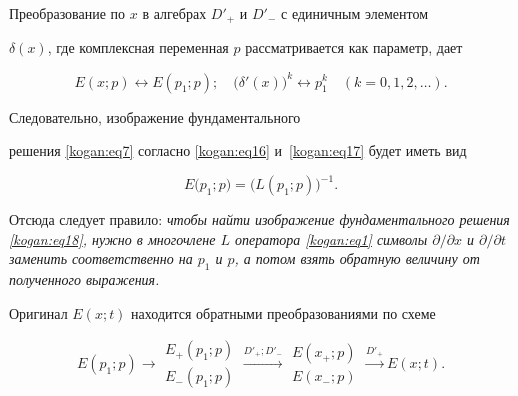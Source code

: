 Преобразование по $x$ в алгебрах $D'_+$ и $D'_-$ с единичным элементом 

$\delta (x)$, где комплексная переменная $p$ рассматривается как параметр, дает 

\begin{equation}

\label{kogan:eq17}

E(x;p)\leftrightarrow E(p_1 ;p);

\quad

\big(\delta'(x) \big)^k \leftrightarrow p_1^k

\quad

(k=0,1,2,\ldots).

\end{equation}

Следовательно, изображение фундаментального 

решения \eqref{kogan:eq7} согласно \eqref{kogan:eq16} и~\eqref{kogan:eq17} будет иметь вид

\begin{equation}

\label{kogan:eq18}

E\big(p_1 ;p\big)=\bigl(L(p_1 ;p) \bigr)^{-1}.

\end{equation}



Отсюда следует правило: {\sl чтобы найти изображение фундаментального решения \eqref{kogan:eq18}, нужно в многочлене $L$ оператора \eqref{kogan:eq1} символы $\partial 

/\partial x$ и $\partial/\partial t$ заменить соответственно на $p_1$ и $p$, а потом взять обратную величину от полученного выражения.} 

Оригинал $E(x;t)$ находится обратными преобразованиями по схеме

\begin{equation}

\label{kogan:eq19}

E (p_1 ;p ) \to \begin{matrix}

E_+ (p_1 ;p) \\

E_- (p_1 ;p) 

\end{matrix} \xrightarrow{D'_+;D'_-}  

\begin{matrix}

E(x_+;p) \\

E(x_-;p)

\end{matrix}  \xrightarrow{D'_+} E(x;t).

\end{equation}



